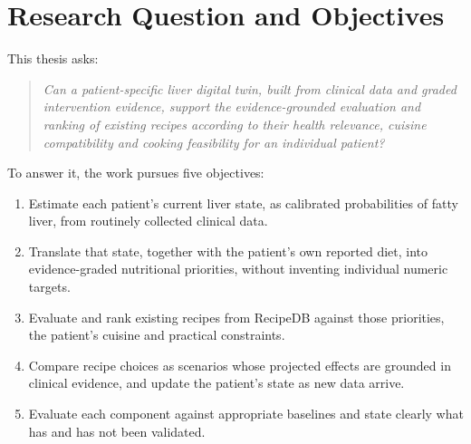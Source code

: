 \section{Research Question and Objectives}
\label{sec:research_question}
This thesis asks:
\begin{quote}
\emph{Can a patient-specific liver digital twin, built from clinical data and
graded intervention evidence, support the evidence-grounded evaluation and
ranking of existing recipes according to their health relevance, cuisine
compatibility and cooking feasibility for an individual patient?}
\end{quote}
To answer it, the work pursues five objectives:
\begin{enumerate}
    \item Estimate each patient's current liver state, as calibrated
          probabilities of fatty liver, from routinely collected clinical data.
    \item Translate that state, together with the patient's own reported
          diet, into evidence-graded nutritional priorities, without
          inventing individual numeric targets.
    \item Evaluate and rank existing recipes from RecipeDB against those
          priorities, the patient's cuisine and practical constraints.
    \item Compare recipe choices as scenarios whose projected effects are
          grounded in clinical evidence, and update the patient's state as new
          data arrive.
    \item Evaluate each component against appropriate baselines and state
          clearly what has and has not been validated.
\end{enumerate}

